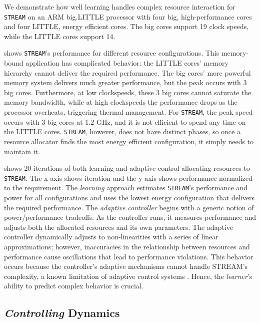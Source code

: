 We demonstrate how well learning handles complex resource interaction
for \texttt{STREAM} on an ARM big.LITTLE processor with four big,
high-performance cores and four LITTLE, energy efficient cores.  The
big cores support 19 clock speeds, while the LITTLE cores support 14.


 shows \texttt{STREAM}'s performance for
different resource configurations.  This memory-bound application has
complicated behavior: the LITTLE cores' memory hierarchy cannot
deliver the required performance.  The big cores' more powerful memory
system delivers much greater performance, but the peak occurs with 3
big cores.  Furthermore, at low clockspeeds, these 3 big cores cannot
saturate the memory bandwidth, while at high clockspeeds the
performance drops as the processor overheats, triggering thermal
management.  For \texttt{STREAM}, the peak speed occurs with 3 big
cores at 1.2 GHz, and it is not efficient to spend any time on the
LITTLE cores.  \texttt{STREAM}, however, does not have distinct
phases, so once a resource allocator finds the most energy efficient
configuration, it simply needs to maintain it.


 shows 20 iterations of both learning
\cite{LEO} and adaptive control \cite{POET} allocating resources to
\texttt{STREAM}.  The x-axis shows iteration and the y-axis shows
performance normalized to the requirement.  The \emph{learning}
approach estimates \texttt{STREAM}'s performance and power for all
configurations and uses the lowest energy configuration that delivers
the required performance.  The \emph{adaptive controller} begins with
a generic notion of power/performance tradeoffs.  As the controller
runs, it measures performance and adjusts both the allocated resources
and its own parameters.  The adaptive controller dynamically adjusts
to non-linearities with a series of linear approximations; however,
inaccuracies in the relationship between resources and performance
cause oscillations that lead to performance violations.  This behavior
occurs because the controller's adaptive mechanisms cannot handle
STREAM's complexity, a known limitation of adaptive control systems
\cite{ControlWare,POET,ICSE2014}.  Hence, the \emph{learner}'s ability
to predict complex behavior is crucial.

\subsection{\emph{Controlling} Dynamics}

